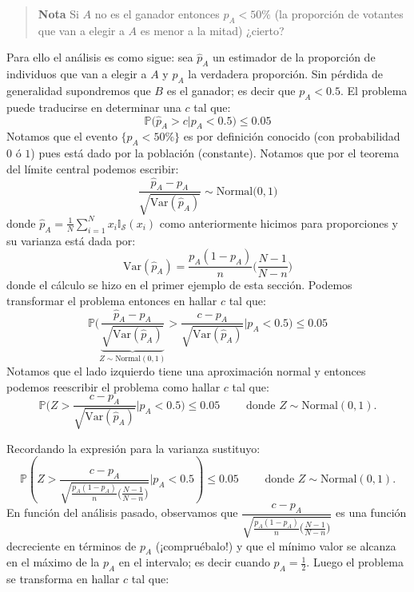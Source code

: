 \documentclass[
]{book}
\begin{document}
\begin{quote}
\textbf{Nota} Si \(A\) no es el ganador entonces \(p_A < 50\%\) (la proporción de votantes que van a elegir a \(A\) es menor a la mitad) ¿cierto?
\end{quote}

Para ello el análisis es como sigue: sea \(\hat{p}_A\) un estimador de la proporción de individuos que van a elegir a \(A\) y \(p_A\) la verdadera proporción. Sin pérdida de generalidad supondremos que \(B\) es el ganador; es decir que \(p_A < 0.5\).
El problema puede traducirse en determinar una \(c\) tal que:
\[
\mathbb{P}\big( \hat{p}_A > c | p_A < 0.5 \big) \leq 0.05
\]
Notamos que el evento \(\{ p_A < 50\%\}\) es por definición conocido (con probabilidad \(0\) ó \(1\)) pues está dado por la población (constante). Notamos que por el teorema del límite central podemos escribir:
\[
\dfrac{\hat{p}_A - p_A}{\sqrt{\text{Var}(\hat{p}_A )}}\sim \text{Normal}\big(0, 1\big)
\]
donde \(\hat{p}_A = \frac{1}{N} \sum_{i = 1}^N x_i \mathbb{I}_{\mathcal{S}}(x_i)\) como anteriormente hicimos para proporciones y su varianza está dada por:
\[
\text{Var}(\hat{p}_A ) = \frac{p_A(1-p_A)}{n}\Big( \frac{N-1}{N-n}\Big)
\]
donde el cálculo se hizo en el primer ejemplo de esta sección. Podemos transformar el problema entonces en hallar \(c\) tal que:
\[
\mathbb{P}\bigg( \underbrace{\frac{\hat{p}_A - p_A}{\sqrt{\text{Var}(\hat{p}_A )}}}_{Z \sim \text{Normal}(0,1)} > \frac{c - p_A}{\sqrt{\text{Var}(\hat{p}_A)}} \bigg| p_A < 0.5 \bigg) \leq 0.05
\]
Notamos que el lado izquierdo tiene una aproximación normal y entonces podemos reescribir el problema como hallar \(c\) tal que:
\[
\mathbb{P}\bigg( Z > \frac{c - p_A}{\sqrt{\text{Var}(\hat{p}_A)}} \bigg| p_A < 0.5 \bigg) \leq 0.05 \qquad \text{ donde } Z \sim \text{Normal}(0,1).
\]

Recordando la expresión para la varianza sustituyo:
\[
\mathbb{P}\left( Z > \dfrac{c - p_A}{\sqrt{\frac{p_A(1-p_A)}{n}\Big( \frac{N-1}{N-n}\Big)}} \Bigg| p_A < 0.5 \right) \leq 0.05 \qquad \text{ donde } Z \sim \text{Normal}(0,1).
\]
En función del análisis pasado, observamos que \(\dfrac{c - p_A}{\sqrt{\frac{p_A(1-p_A)}{n}\Big( \frac{N-1}{N-n}\Big)}}\) es una función decreciente en términos de \(p_A\) (¡compruébalo!) y que el mínimo valor se alcanza en el máximo de la \(p_A\) en el intervalo; es decir cuando \(p_A = \frac{1}{2}\). Luego el problema se transforma en hallar \(c\) tal que:
\end{document}
